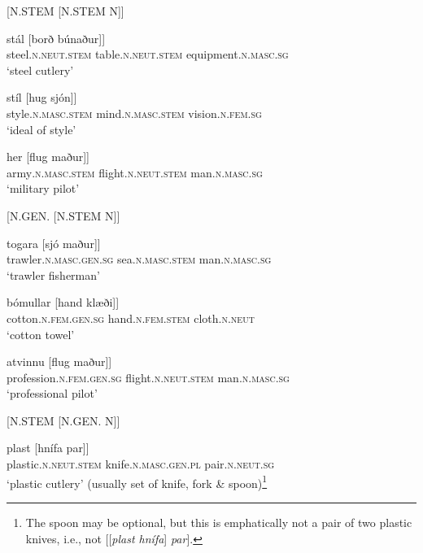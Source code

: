 \documentclass[output=paper]{LSP/langsci}
\begin{document}
\ea%
 \label{ex:bjarnadottir:10} 
\begin{xlist}
 
 [N.STEM [N.STEM N]]

\begin{xlist}
\gll {\ob}stál [borð búnaður]]\\
 steel\textsc{.n.neut.stem} table\textsc{.n.neut.stem} equipment.\textsc{n.masc.sg}\\
\glt ‘steel cutlery’

\gll {\ob}stíl [hug sjón]] \\
 style\textsc{.n.masc.stem} mind\textsc{.n.masc.stem} vision\textsc{.n.fem.sg}\\
\glt ‘ideal of style’

\gll {\ob}her [flug maður]] \\
 army\textsc{.n.masc.stem} flight\textsc{.n.neut.stem} man\textsc{.n.masc.sg}\\
\glt ‘military pilot’
\end{xlist}

  [N.GEN. [N.STEM N]]
\begin{xlist}
\gll {\ob}togara [sjó maður]] \\
 trawler\textsc{.n.masc.gen.sg} sea\textsc{.n.masc.stem} man\textsc{.n.masc.sg}\\
\glt ‘trawler fisherman’

\gll {\ob}bómullar  [hand klæði]] \\
 cotton\textsc{.n.fem.gen.sg} hand\textsc{.n.fem.stem} cloth\textsc{.n.neut}\\
\glt ‘cotton towel’

\gll {\ob}atvinnu  [flug maður]] \\
 profession\textsc{.n.fem.gen.sg} flight\textsc{.n.neut.stem} man\textsc{.n.masc.sg}\\
\glt ‘professional pilot’
\end{xlist}
  [N.STEM [N.GEN. N]]
\begin{xlist}
 \label{ex:bjarnadottir:10g}
\gll {\ob}plast [hnífa par]] \\
 plastic\textsc{.n.neut.stem} knife\textsc{.n.masc.gen.pl} pair\textsc{.n.neut.sg}\\
\glt ‘plastic cutlery’ (usually set of knife, fork \& spoon)\footnote{The spoon may be optional, but this is emphatically not a pair of two plastic knives, i.e., not [[\textit{plast hnífa}] \textit{par}].}


\end{xlist}
\end{xlist}
\end{document}
